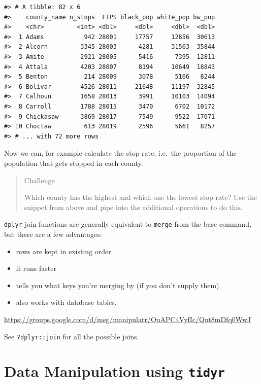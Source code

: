 \documentclass[
]{book}
\providecommand{\tightlist}{%
  \setlength{\itemsep}{0pt}\setlength{\parskip}{0pt}}
\begin{document}
\begin{verbatim}
#> # A tibble: 82 x 6
#>    county_name n_stops  FIPS black_pop white_pop bw_pop
#>    <chr>         <int> <dbl>     <dbl>     <dbl>  <dbl>
#>  1 Adams           942 28001     17757     12856  30613
#>  2 Alcorn         3345 28003      4281     31563  35844
#>  3 Amite          2921 28005      5416      7395  12811
#>  4 Attala         4203 28007      8194     10649  18843
#>  5 Benton          214 28009      3078      5166   8244
#>  6 Bolivar        4526 28011     21648     11197  32845
#>  7 Calhoun        1658 28013      3991     10103  14094
#>  8 Carroll        1788 28015      3470      6702  10172
#>  9 Chickasaw      3869 28017      7549      9522  17071
#> 10 Choctaw         613 28019      2596      5661   8257
#> # ... with 72 more rows
\end{verbatim}

Now we can, for example calculate the stop rate, i.e.~the proportion of the population that gets stopped in each county.

\begin{quote}
Challenge

Which county has the highest and which one the lowest stop rate?
Use the snippet from above and pipe into the additional operations
to do this.
\end{quote}

\texttt{dplyr} join functions are generally equivalent to \texttt{merge} from the base command, but there are a few advantages:

\begin{itemize}
\tightlist
\item
  rows are kept in existing order
\item
  it runs faster
\item
  tells you what keys you're merging by (if you don't supply them)
\item
  also works with database tables.
\end{itemize}

\url{https://groups.google.com/d/msg/manipulatr/OuAPC4VyfIc/Qnt8mDfq0WwJ}

See \texttt{?dplyr::join} for all the possible joins.

\hypertarget{tidyr}{%
\chapter{\texorpdfstring{Data Manipulation using \textbf{\texttt{tidyr}}}{Data Manipulation using tidyr}}\label{tidyr}}
\end{document}
